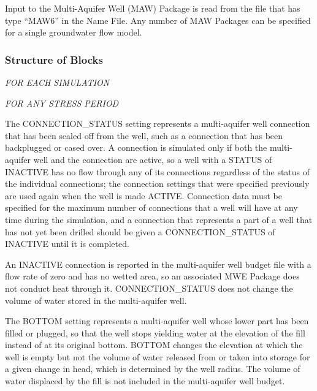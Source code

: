 Input to the Multi-Aquifer Well (MAW) Package is read from the file that has type ``MAW6'' in the Name File.  Any number of MAW Packages can be specified for a single groundwater flow model.

\vspace{5mm}
\subsubsection{Structure of Blocks}
\vspace{5mm}

\noindent \textit{FOR EACH SIMULATION}





\vspace{5mm}
\noindent \textit{FOR ANY STRESS PERIOD}


\vspace{5mm}
\noindent The CONNECTION\_STATUS setting represents a multi-aquifer well connection that has been sealed off from the well, such as a connection that has been backplugged or cased over. A connection is simulated only if both the multi-aquifer well and the connection are active, so a well with a STATUS of INACTIVE has no flow through any of its connections regardless of the status of the individual connections; the connection settings that were specified previously are used again when the well is made ACTIVE. Connection data must be specified for the maximum number of connections that a well will have at any time during the simulation, and a connection that represents a part of a well that has not yet been drilled should be given a CONNECTION\_STATUS of INACTIVE until it is completed.

An INACTIVE connection is reported in the multi-aquifer well budget file with a flow rate of zero and has no wetted area, so an associated MWE Package does not conduct heat through it. CONNECTION\_STATUS does not change the volume of water stored in the multi-aquifer well.

The BOTTOM setting represents a multi-aquifer well whose lower part has been filled or plugged, so that the well stops yielding water at the elevation of the fill instead of at its original bottom. BOTTOM changes the elevation at which the well is empty but not the volume of water released from or taken into storage for a given change in head, which is determined by the well radius. The volume of water displaced by the fill is not included in the multi-aquifer well budget.

